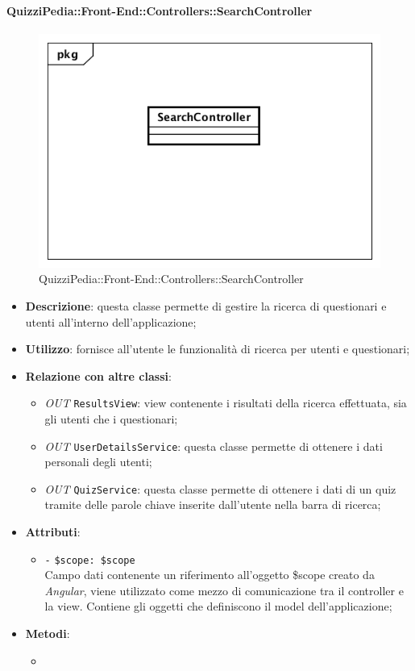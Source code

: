 \paragraph{QuizziPedia::Front-End::Controllers::SearchController}
\begin{figure} [ht]
	\centering
	\includegraphics[scale=0.45]{UML/Classi/Front-End/QuizziPedia_Front-end_Controller_SearchController.png}
	\caption{QuizziPedia::Front-End::Controllers::SearchController}
\end{figure} \FloatBarrier
\begin{itemize}
	\item \textbf{Descrizione}: questa classe permette di gestire la ricerca di questionari e utenti all'interno dell'applicazione;
	\item \textbf{Utilizzo}: fornisce all'utente le funzionalità di ricerca per utenti e questionari;
	\item \textbf{Relazione con altre classi}:
	\begin{itemize}
		\item \textit{OUT} \texttt{ResultsView}: view contenente i risultati della ricerca effettuata, sia gli utenti che i questionari;
		\item \textit{OUT} \texttt{UserDetailsService}: questa classe permette di ottenere i dati personali degli utenti;
		\item \textit{OUT} \texttt{QuizService}: questa classe permette di ottenere i dati di un quiz tramite delle parole chiave inserite dall'utente nella barra di ricerca;
	\end{itemize}
	\item \textbf{Attributi}:
	\begin{itemize}
		\item \texttt{-} \texttt{\$scope: \$scope} \\
		Campo dati contenente un riferimento all’oggetto \$scope creato da \textit{Angular}, viene utilizzato come mezzo di comunicazione tra il controller e la view. Contiene gli oggetti che definiscono il model dell’applicazione;
	\end{itemize}
	\item \textbf{Metodi}:
	\begin{itemize}
		\item 
	\end{itemize}
\end{itemize}

